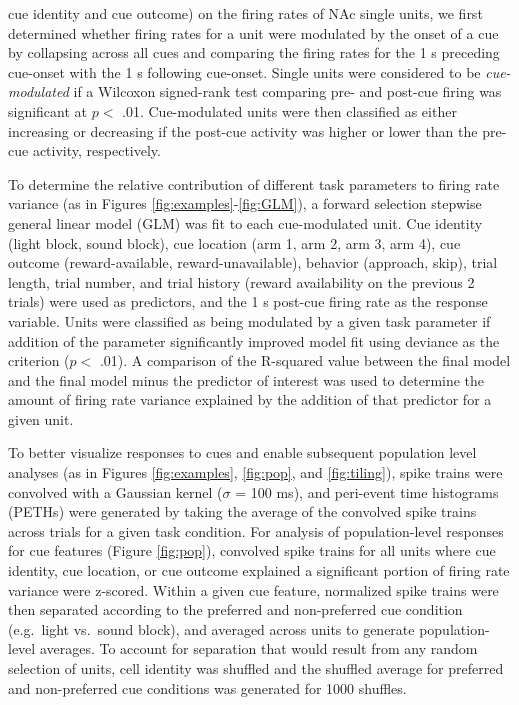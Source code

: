 \documentclass[11pt]{article}
\begin{document}
{cue identity and cue outcome) on the firing rates of NAc single units, we first
  determined whether firing rates for a unit were modulated by the onset of a
  cue by collapsing across all cues and comparing the firing rates for the 1 s
  preceding cue-onset with the 1 s following cue-onset. Single units were
  considered to be {\it cue-modulated} if a Wilcoxon signed-rank test comparing
  pre- and post-cue firing was significant at $p <$ .01. Cue-modulated units
  were then classified as either increasing or decreasing if the post-cue
  activity was higher or lower than the pre-cue activity, respectively.

To determine the relative contribution of different task parameters to firing
rate variance (as in Figures \ref{fig:examples}-\ref{fig:GLM}), a forward
selection stepwise general linear model (GLM) was fit to each cue-modulated
unit. Cue identity (light block, sound block), cue location (arm 1, arm 2, arm
3, arm 4), cue outcome (reward-available, reward-unavailable), behavior
(approach, skip), trial length, trial number, and trial history (reward
availability on the previous 2 trials) were used as predictors, and the 1 s
post-cue firing rate as the response variable. Units were classified as being
modulated by a given task parameter if addition of the parameter significantly
improved model fit using deviance as the criterion ($p <$ .01). A comparison of
the R-squared value between the final model and the final model minus the
predictor of interest was used to determine the amount of firing rate variance
explained by the addition of that predictor for a given unit.

To better visualize responses to cues and enable subsequent population level
analyses (as in Figures \ref{fig:examples}, \ref{fig:pop}, and
\ref{fig:tiling}), spike trains were convolved with a Gaussian kernel ($\sigma$
= 100 ms), and peri-event time histograms (PETHs) were generated by taking the
average of the convolved spike trains across trials for a given task
condition. For analysis of population-level responses for cue features (Figure
\ref{fig:pop}), convolved spike trains for all units where cue identity, cue
location, or cue outcome explained a significant portion of firing rate variance
were z-scored. Within a given cue feature, normalized spike trains were then
separated according to the preferred and non-preferred cue condition
(e.g.\ light vs.\ sound block), and averaged across units to generate
population-level averages. To account for separation that would result from any
random selection of units, cell identity was shuffled and the shuffled average
for preferred and non-preferred cue conditions was generated for 1000 shuffles.

}
\end{document}
